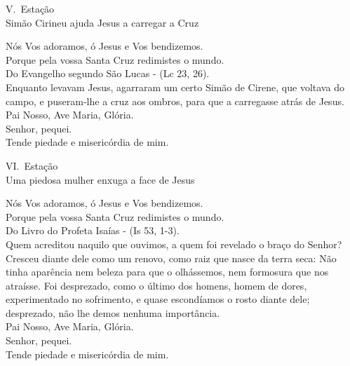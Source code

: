 \documentclass{book}
\begin{document}
\newpage
\begin{center}
    V.\ Estação \\ Simão Cirineu ajuda Jesus a carregar a Cruz
\end{center}
\begin{flushleft}
    \VbarRed{} Nós Vos adoramos, ó Jesus e Vos bendizemos. \\
    \RbarRed{} Porque pela vossa Santa Cruz redimistes o mundo.
    \vspace{.2cm} \\
    Do Evangelho segundo São Lucas - (\textcolor{VioletRed2}{Lc 23, 26}).
    \vspace{.2cm} \\
    Enquanto levavam Jesus, agarraram um certo Simão de Cirene, que voltava do campo, e puseram-lhe a cruz aos ombros, para que a carregasse atrás de Jesus.
    \vspace{.2cm} \\
    Pai Nosso, Ave Maria, Glória.
    \vspace{.2cm} \\
    \VbarRed{} Senhor, pequei. \\
    \RbarRed{} Tende piedade e misericórdia de mim.
\end{flushleft}
\begin{center}
    VI.\ Estação \\ Uma piedosa mulher enxuga a face de Jesus
\end{center}
\begin{flushleft}
    \VbarRed{} Nós Vos adoramos, ó Jesus e Vos bendizemos. \\
    \RbarRed{} Porque pela vossa Santa Cruz redimistes o mundo.
    \vspace{.2cm} \\
    Do Livro do Profeta Isaías - (\textcolor{VioletRed2}{Is 53, 1-3}).
    \vspace{.2cm} \\
    Quem acreditou naquilo que ouvimos, a quem foi revelado o braço do Senhor? Cresceu diante dele como um renovo, como raiz que nasce da terra seca: Não tinha aparência nem beleza para que o olhássemos, nem formosura que nos atraísse. Foi desprezado, como o último dos homens, homem de dores, experimentado no sofrimento, e quase escondíamos o rosto diante dele; desprezado, não lhe demos nenhuma importância.
    \vspace{.2cm} \\
    Pai Nosso, Ave Maria, Glória.
    \vspace{.2cm} \\
    \VbarRed{} Senhor, pequei. \\
    \RbarRed{} Tende piedade e misericórdia de mim.
\end{flushleft}
\end{document}

